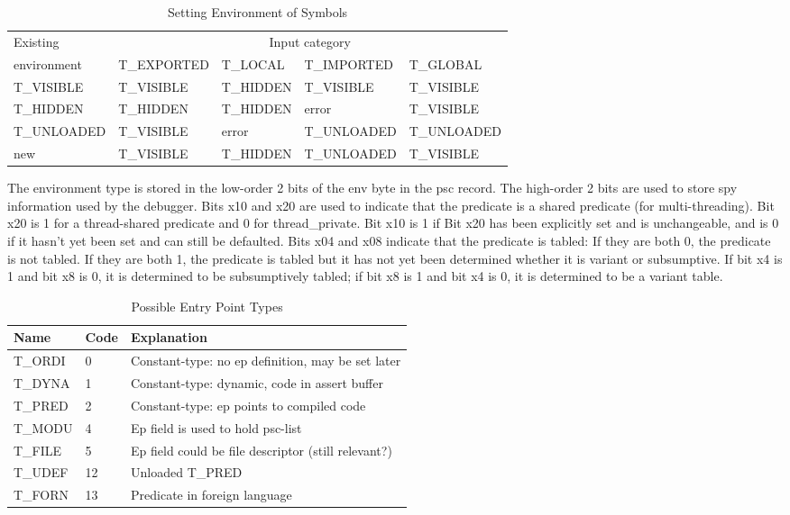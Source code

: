 \documentclass[11pt]{article}
\begin{document}
\begin{table}\centering
\begin{tabular}{l|llll}
\hline
Existing     & \multicolumn{4}{c}{Input category}	\\ \cline{2-5}
environment  &  T\_EXPORTED &  T\_LOCAL & T\_IMPORTED & T\_GLOBAL \\
\hline
T\_VISIBLE   & T\_VISIBLE & T\_HIDDEN & T\_VISIBLE  & T\_VISIBLE \\
T\_HIDDEN    & T\_HIDDEN  & T\_HIDDEN & error       & T\_VISIBLE \\
T\_UNLOADED  & T\_VISIBLE & error     & T\_UNLOADED & T\_UNLOADED\\
new          & T\_VISIBLE & T\_HIDDEN & T\_UNLOADED & T\_VISIBLE \\
\hline
\end{tabular}
\caption{Setting Environment of Symbols}
\label{t:envset}
\end{table}
%
The environment type is stored in the low-order 2 bits of the env byte
in the psc record.  The high-order 2 bits are used to store spy
information used by the debugger.  Bits x10 and x20 are used to
indicate that the predicate is a shared predicate (for
multi-threading).  Bit x20 is 1 for a thread-shared predicate and 0
for thread_private.  Bit x10 is 1 if Bit x20 has been explicitly set
and is unchangeable, and is 0 if it hasn't yet been set and can still
be defaulted.  Bits x04 and x08 indicate that the predicate is tabled:
If they are both 0, the predicate is not tabled.  If they are both 1,
the predicate is tabled but it has not yet been determined whether it
is variant or subsumptive.  If bit x4 is 1 and bit x8 is 0, it is
determined to be subsumptively tabled; if bit x8 is 1 and bit x4 is 0,
it is determined to be a variant table.

\begin{table}\centering
\begin{tabular}{l|l|l}
\hline
Name & Code	& Explanation				\\
\hline

T\_ORDI  & 0	& Constant-type: no ep definition, may be set later  \\
T\_DYNA	& 1	& Constant-type: dynamic, code in assert buffer  \\
T\_PRED  & 2	& Constant-type: ep points to compiled code  \\
T\_MODU  & 4	& Ep field is used to hold psc-list  \\
T\_FILE  & 5	& Ep field could be file descriptor (still relevant?)  \\
T\_UDEF & 12	& Unloaded T\_PRED  \\
T\_FORN & 13	& Predicate in foreign language  \\
\hline
\end{tabular}
\caption{Possible Entry Point Types}
\label{t:ep}
\end{table}
%
\end{document}
